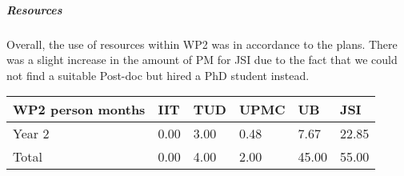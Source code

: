 \subparagraph{Resources}
Overall, the use of resources within WP2 was in accordance to the plans. There was a slight increase in the amount of PM for JSI due to the fact that we could not find a suitable Post-doc but hired a PhD student instead.

\begin{center}
\begin{tabular}{|C{1.5cm}|C{1.5cm}|C{1.5cm}|C{2cm}|C{2cm}|C{2cm}|}
\hline
\footnotesize \textbf{WP2 person months}& \footnotesize \textbf{IIT}&\footnotesize \textbf{TUD}&\footnotesize \textbf{UPMC}& \footnotesize \textbf{UB} &\footnotesize \textbf{JSI}\\ \hline
\footnotesize Year 2 &     0.00& 3.00 & 0.48 & 7.67 & 22.85   \\  \hline
\footnotesize Total &  0.00	 & 4.00 & 2.00 & 45.00 & 55.00 \\ \hline
\end{tabular}
\end{center}
